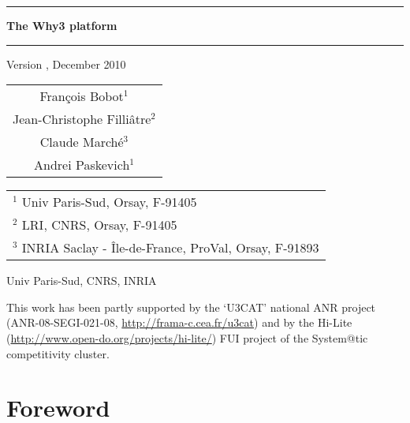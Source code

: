 \documentclass[a4paper,11pt,twoside,openright]{memoir}
\begin{document}
\sloppy
{}

\thispagestyle{empty}

\begin{center}

\rule\textwidth{0.8mm}

\vfill

{\fontsize{40}{40pt}\selectfont\bfseries\sffamily The Why3 platform}

\vfill

\rule\textwidth{0.8mm}

\vfill

\begin{LARGE}
  Version \whyversion{}, December 2010
\end{LARGE}

\vfill

\begin{Large}
  \begin{tabular}{c}
  Fran\c{c}ois Bobot$^{1}$ \\
  Jean-Christophe Filli\^atre$^{2}$  \\
  Claude March\'e$^{3}$ \\
  Andrei Paskevich$^{1}$
\end{tabular}
\end{Large}
\vfill

\begin{flushleft}

\begin{tabular}{l}
$^1$ Univ Paris-Sud, Orsay, F-91405 \\
$^2$ LRI, CNRS, Orsay, F-91405 \\
$^3$ INRIA Saclay - \^Ile-de-France, ProVal, Orsay, F-91893
\end{tabular}

\bigskip

   Univ Paris-Sud, CNRS, INRIA

  This work has been partly supported by the `U3CAT' national ANR project
  (ANR-08-SEGI-021-08, \url{http://frama-c.cea.fr/u3cat}) and by the
  Hi-Lite (\url{http://www.open-do.org/projects/hi-lite/}) FUI project of the
  System@tic competitivity cluster.

\end{flushleft}
\end{center}

\chapter*{Foreword}
\end{document}
